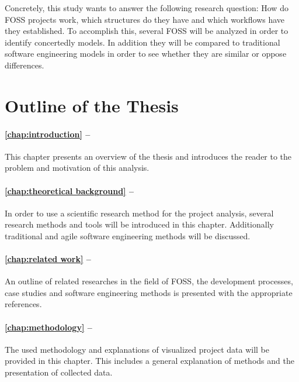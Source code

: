 Concretely, this study wants to answer the following research question: How do
\ac{FOSS} projects work, which structures do they have and which workflows have
they established. To accomplish this, several \ac{FOSS} will be analyzed in
order to identify concertedly models. In addition they will be compared to
traditional software engineering models in order to see whether they are
similar or oppose differences.


\section{Outline of the Thesis} %

\paragraph{\autoref{chap:introduction} -- }

This chapter presents an overview of the thesis and introduces the reader to
the problem and motivation of this analysis.

\paragraph{\autoref{chap:theoretical background} -- }

In order to use a scientific research method for the project analysis, several
research methods and tools will be introduced in this chapter. Additionally
traditional and agile software engineering methods will be discussed.

\paragraph{\autoref{chap:related work} -- }

An outline of related researches in the field of \ac{FOSS}, the development
processes, case studies and software engineering methods is presented with the
appropriate references.

\paragraph{\autoref{chap:methodology} -- }

The used methodology and explanations of visualized project data will be
provided in this chapter. This includes a general explanation of methods and
the presentation of collected data.

